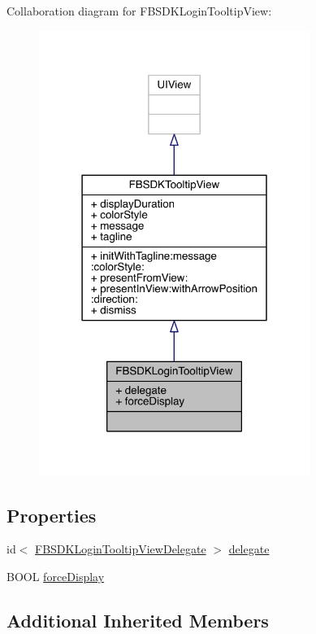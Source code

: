Collaboration diagram for F\-B\-S\-D\-K\-Login\-Tooltip\-View\-:
\nopagebreak
\begin{figure}[H]
\begin{center}
\leavevmode
\includegraphics[width=250pt]{interface_f_b_s_d_k_login_tooltip_view__coll__graph}
\end{center}
\end{figure}
\subsection*{Properties}
\begin{DoxyCompactItemize}
\item 
id$<$ \hyperlink{protocol_f_b_s_d_k_login_tooltip_view_delegate-p}{F\-B\-S\-D\-K\-Login\-Tooltip\-View\-Delegate} $>$ \hyperlink{interface_f_b_s_d_k_login_tooltip_view_a8f0879fab37905fb4b8f29515a055c00}{delegate}
\item 
B\-O\-O\-L \hyperlink{interface_f_b_s_d_k_login_tooltip_view_a5d7116f500f006d7d1d0d5c826b0b493}{force\-Display}
\end{DoxyCompactItemize}
\subsection*{Additional Inherited Members}


